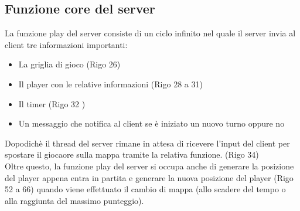 \documentclass[a4paper]{article}
\begin{document}
\subsection{Funzione core del server}
La funzione play del server consiste di un ciclo infinito nel quale il server invia al client tre informazioni importanti:
\begin{itemize}
  \setlength\itemsep{0.2mm}
  \item La griglia di gioco (Rigo 26)
  \item Il player con le relative informazioni (Rigo 28 a 31)
  \item Il timer (Rigo 32 )
  \item Un messaggio che notifica al client se è iniziato un nuovo turno oppure no
\end{itemize}
Dopodichè il thread del server rimane in attesa di ricevere l'input del client per spostare il giocaore sulla mappa tramite la relativa funzione. (Rigo 34)
\\Oltre questo, la funzione play del server si occupa anche di generare la posizione del player appena entra in partita e generare la nuova posizione del player (Rigo 52 a 66) quando viene effettuato il cambio di mappa (allo scadere del tempo o alla raggiunta del massimo punteggio).
\\
\\
\end{document}
